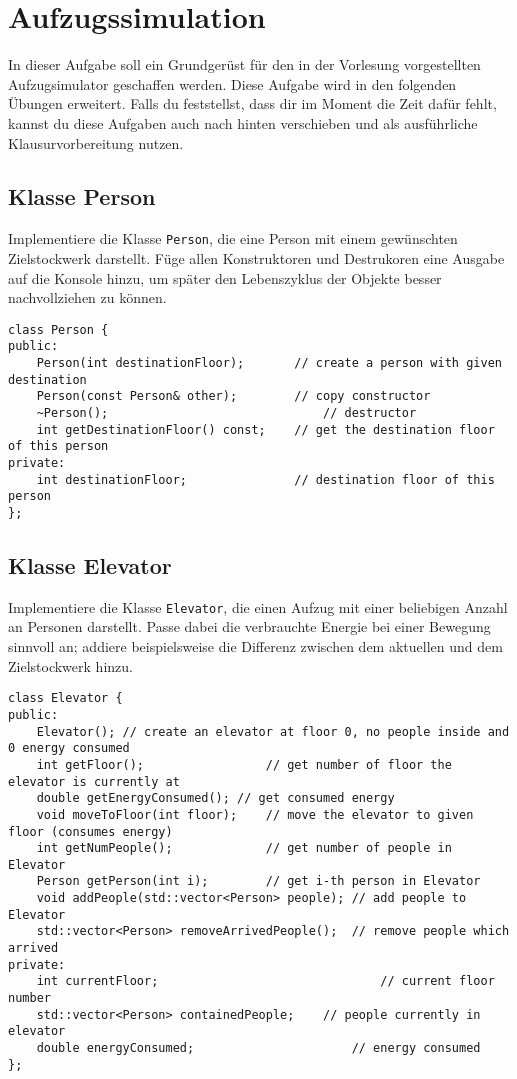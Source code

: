 \section{Aufzugssimulation}
In dieser Aufgabe soll ein Grundgerüst für den in der Vorlesung vorgestellten Aufzugsimulator geschaffen werden.
Diese Aufgabe wird in den folgenden Übungen erweitert.
Falls du feststellst, dass dir im Moment die Zeit dafür fehlt, kannst du diese Aufgaben auch nach hinten verschieben und als ausführliche Klausurvorbereitung nutzen.

\subsection{Klasse Person}
Implementiere die Klasse \texttt{Person}, die eine Person mit einem gewünschten Zielstockwerk darstellt.
Füge allen Konstruktoren und Destrukoren eine Ausgabe auf die Konsole hinzu, um später den Lebenszyklus der Objekte besser nachvollziehen zu können.

\begin{lstlisting}
class Person {
public:
	Person(int destinationFloor);		// create a person with given destination
	Person(const Person& other);		// copy constructor
	~Person();								// destructor
	int getDestinationFloor() const;	// get the destination floor of this person
private:
	int destinationFloor;				// destination floor of this person
};
\end{lstlisting}

\subsection{Klasse Elevator}
Implementiere die Klasse \texttt{Elevator}, die einen Aufzug mit einer beliebigen Anzahl an Personen darstellt.
Passe dabei die verbrauchte Energie bei einer Bewegung sinnvoll an; addiere beispielsweise die Differenz zwischen dem aktuellen und dem Zielstockwerk hinzu.

\begin{lstlisting}
class Elevator {
public:
	Elevator();	// create an elevator at floor 0, no people inside and 0 energy consumed
	int getFloor();					// get number of floor the elevator is currently at
	double getEnergyConsumed();	// get consumed energy
	void moveToFloor(int floor);	// move the elevator to given floor (consumes energy)
	int getNumPeople();				// get number of people in Elevator
	Person getPerson(int i);		// get i-th person in Elevator
	void addPeople(std::vector<Person> people);	// add people to Elevator
	std::vector<Person> removeArrivedPeople();	// remove people which arrived
private:
	int currentFloor;								// current floor number
	std::vector<Person> containedPeople;	// people currently in elevator
	double energyConsumed;						// energy consumed
};
\end{lstlisting}

